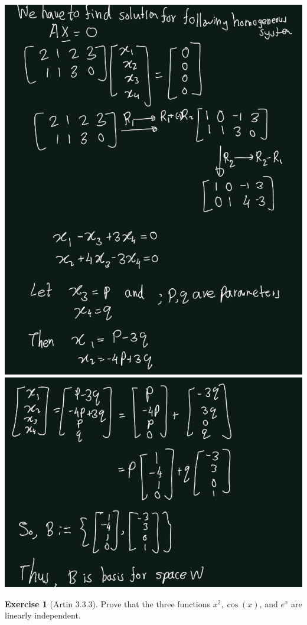 \documentclass[
]{book}
\theoremstyle{definition}
\theoremstyle{definition}
\theoremstyle{definition}
\newtheorem{exercise}{Exercise}[chapter]
\theoremstyle{definition}
\theoremstyle{remark}
\begin{document}
\includegraphics{figures/ch_3/ex-3.2-1.png}
\includegraphics{figures/ch_3/ex-3.2-2.png}

\begin{exercise}[Artin 3.3.3]
\protect\hypertarget{exr:unnamed-chunk-295}{}\label{exr:unnamed-chunk-295}Prove that the three functions \(x^2, \cos(x)\), and \(e^x\) are linearly independent.
\end{exercise}
\end{document}
